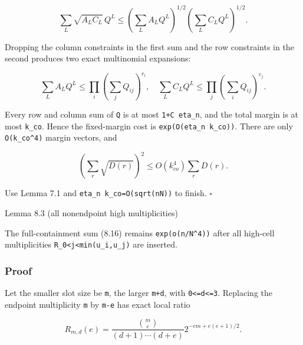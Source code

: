 \documentclass[
  11pt,
  a4paper,
]{article}
\begin{document}
\[
 \sum_L\sqrt{A_LC_L}\,Q^L
 \le\left(\sum_LA_LQ^L\right)^{1/2}
      \left(\sum_LC_LQ^L\right)^{1/2}.                 \tag{8.18}
\]

Dropping the column constraints in the first sum and the row constraints
in the second produces two exact multinomial expansions:

\[
 \sum_LA_LQ^L\le\prod_i\left(\sum_jQ_{ij}\right)^{r_i},
 \quad
 \sum_LC_LQ^L\le\prod_j\left(\sum_iQ_{ij}\right)^{c_j}.
                                                               \tag{8.19}
\]

Every row and column sum of \texttt{Q} is at most \texttt{1+C\ eta\_n},
and the total margin is at most \texttt{k\_co}. Hence the fixed-margin
cost is
\texttt{exp(O(eta\_}\allowbreak{}\texttt{n\ k\_}\allowbreak{}\texttt{co)}\allowbreak{}\texttt{)}.
There are only \texttt{O(k\_co\^{}4)} margin vectors, and

\[
 \left(\sum_r\sqrt{D(r)}\right)^2
 \le O(k_{co}^4)\sum_rD(r).                              \tag{8.20}
\]

Use Lemma 7.1 and
\texttt{eta\_}\allowbreak{}\texttt{n\ k\_}\allowbreak{}\texttt{co=}\allowbreak{}\texttt{O(sqrt(nN)}\allowbreak{}\texttt{)}
to finish. \(\square\)

{}
\label{lemma-8.3-all-nonendpoint-high-multiplicities}
\begin{lemmabox}{Lemma 8.3 (all nonendpoint high multiplicities)}

The full-containment sum (8.16) remains \texttt{exp(o(n/N\^{}4))} after
all high-cell multiplicities
\texttt{R\_}\allowbreak{}\texttt{0\textless{}}\allowbreak{}\texttt{j\textless{}}\allowbreak{}\texttt{min(u\_}\allowbreak{}\texttt{i,}\allowbreak{}\texttt{u\_}\allowbreak{}\texttt{j)}
are inserted.

\end{lemmabox}

\subsubsection{Proof}\label{proof-7}

Let the smaller slot size be \texttt{m}, the larger \texttt{m+d}, with
\texttt{0\textless{}=d\textless{}=3}. Replacing the endpoint
multiplicity \texttt{m} by \texttt{m-e} has exact local ratio

\[
 R_{m,d}(e)=
 \frac{\binom me}{(d+1)\cdots(d+e)}
 2^{-em+e(e+1)/2}.                                      \tag{8.21}
\]
\end{document}
